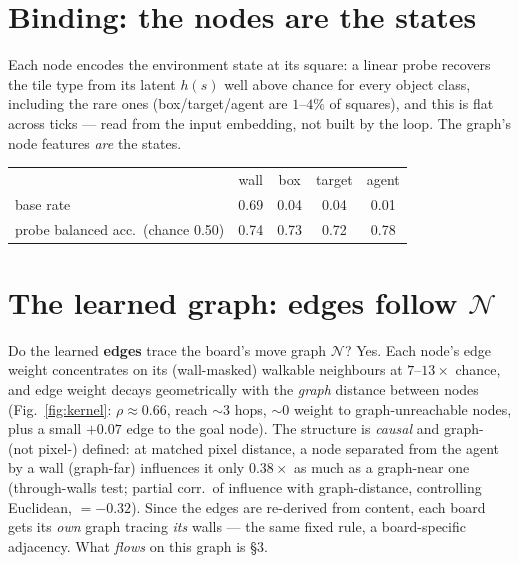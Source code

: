 \documentclass[11pt]{article}
\newcommand{\NN}{\mathcal{N}}
\begin{document}
\section{Binding: the nodes are the states}
\vspace{-2pt}
Each node encodes the environment state at its square: a linear probe recovers the tile type from its latent
$h(s)$ well above chance for every object class, including the rare ones (box/target/agent are $1$--$4\%$ of
squares), and this is flat across ticks --- read from the input embedding, not built by the loop. The graph's
node features \emph{are} the states.
\begin{center}\small
\begin{tabular}{lcccc}
\toprule
 & wall & box & target & agent\\
base rate & 0.69 & 0.04 & 0.04 & 0.01\\
\midrule
probe balanced acc.\ (chance 0.50) & 0.74 & 0.73 & 0.72 & 0.78\\
\bottomrule
\end{tabular}
\end{center}

\section{The learned graph: edges follow $\NN$}
\vspace{-2pt}
Do the learned \textbf{edges} trace the board's move graph $\NN$? Yes. Each node's edge weight concentrates
on its (wall-masked) walkable neighbours at $7$--$13\times$ chance, and edge weight decays geometrically with
the \emph{graph} distance between nodes (Fig.~\ref{fig:kernel}: $\rho{\approx}0.66$, reach $\sim$3 hops,
${\sim}0$ weight to graph-unreachable nodes, plus a small $+0.07$ edge to the goal node). The structure is
\emph{causal} and graph- (not pixel-) defined: at matched pixel distance, a node separated from the agent by
a wall (graph-far) influences it only $0.38\times$ as much as a graph-near one (through-walls test; partial
corr.\ of influence with graph-distance, controlling Euclidean, $=-0.32$). Since the edges are re-derived
from content, each board gets its \emph{own} graph tracing \emph{its} walls --- the same fixed rule, a
board-specific adjacency. What \emph{flows} on this graph is \S3.
\end{document}

